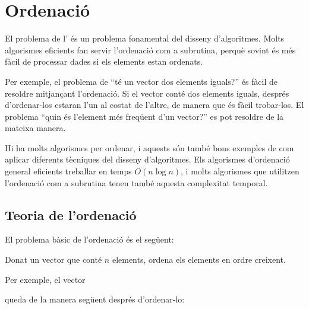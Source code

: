\chapter{Ordenació}

El problema de l'
és un problema fonamental del disseny d'algoritmes.
Molts algorismes eficients
fan servir l'ordenació com a subrutina,
perquè sovint és més fàcil de processar
dades si els elements estan ordenats.

Per exemple, el problema de ``té un vector dos elements iguals?'' és
fàcil de resoldre mitjançant l'ordenació.  Si el vector conté dos
elements iguals, després d'ordenar-los estaran l'un al costat de
l'altre, de manera que és fàcil trobar-los.  El problema ``quin és
l'element més freqüent d'un vector?'' es pot resoldre de la mateixa
manera.

Hi ha molts algorismes per ordenar, i aquests són
també bons exemples de com aplicar
diferents tècniques del disseny d'algoritmes.
Els algorismes d'ordenació general eficients
treballar en temps $O(n \log n)$,
i molts algorismes que utilitzen l'ordenació
com a subrutina tenen també aquesta complexitat temporal.

\section{Teoria de l'ordenació}

El problema bàsic de l'ordenació és el següent:
\begin{framed}
\noindent
Donat un vector que conté $n$ elements,
ordena els elements en ordre creixent.
\end{framed}
\noindent
Per exemple, el vector
\begin{center}
\end{center}
queda de la manera següent després d'ordenar-lo:
\begin{center}
\end{center}

